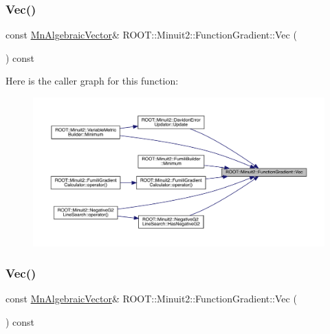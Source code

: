 \subsubsection{\texorpdfstring{Vec()}{Vec()}\hspace{0.1cm}{\footnotesize\ttfamily [1/3]}}
{\footnotesize\ttfamily const \mbox{\hyperlink{namespaceROOT_1_1Minuit2_a62ed97730a1ca8d3fbaec64a19aa11c9}{Mn\+Algebraic\+Vector}}\& R\+O\+O\+T\+::\+Minuit2\+::\+Function\+Gradient\+::\+Vec (\begin{DoxyParamCaption}{ }\end{DoxyParamCaption}) const\hspace{0.3cm}{\ttfamily [inline]}}

Here is the caller graph for this function\+:
\nopagebreak
\begin{figure}[H]
\begin{center}
\leavevmode
\includegraphics[width=350pt]{d3/d48/classROOT_1_1Minuit2_1_1FunctionGradient_abdf0fd7d9e1a730049112f0c903a9f5f_icgraph}
\end{center}
\end{figure}
\mbox{\label{classROOT_1_1Minuit2_1_1FunctionGradient_abdf0fd7d9e1a730049112f0c903a9f5f}} 
\subsubsection{\texorpdfstring{Vec()}{Vec()}\hspace{0.1cm}{\footnotesize\ttfamily [2/3]}}
{\footnotesize\ttfamily const \mbox{\hyperlink{namespaceROOT_1_1Minuit2_a62ed97730a1ca8d3fbaec64a19aa11c9}{Mn\+Algebraic\+Vector}}\& R\+O\+O\+T\+::\+Minuit2\+::\+Function\+Gradient\+::\+Vec (\begin{DoxyParamCaption}{ }\end{DoxyParamCaption}) const\hspace{0.3cm}{\ttfamily [inline]}}

